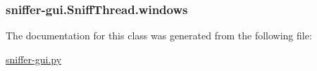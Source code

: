 \hypertarget{classsniffer-gui_1_1SniffThread_a60dcff7a710f4b3e0ba43da9d68d1afd}{
\subsubsection[{windows}]{\setlength{\rightskip}{0pt plus 5cm}sniffer-\/gui.\-Sniff\-Thread.\-windows}}\label{classsniffer-gui_1_1SniffThread_a60dcff7a710f4b3e0ba43da9d68d1afd}


The documentation for this class was generated from the following file\-:\begin{DoxyCompactItemize}
\item 
\hyperlink{sniffer-gui_8py}{sniffer-\/gui.\-py}\end{DoxyCompactItemize}
